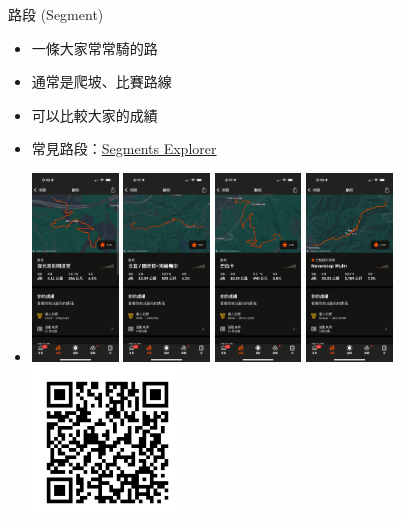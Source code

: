 \begin{frame}{路段 (Segment)}
\begin{itemize}
\item 一條大家常常騎的路\pause
\item 通常是爬坡、比賽路線\pause
\item 可以比較大家的成績\pause
\item 常見路段：\href{https://brianhsu7476.github.io/segmentsExplorer/}{Segments Explorer}
\item \includegraphics[height=5cm]{maokongSegment.png}
\includegraphics[height=5cm]{coffeeSegment.png}
\includegraphics[height=5cm]{balakaSegment.png}
\includegraphics[height=5cm]{wulingSegment.png}
\includegraphics[height=4cm]{segmentsExplorer.png}
\end{itemize}
\end{frame}

